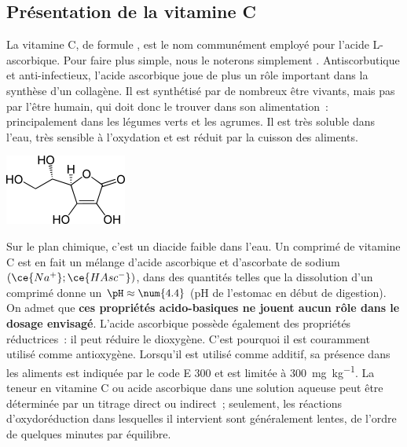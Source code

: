 \documentclass[../main/main.tex]{subfiles}
\begin{document}
{	\subsection{Présentation de la vitamine C}
	\noindent
	\begin{minipage}[t]{.70\linewidth}
		La vitamine C, de formule , est le nom communément employé pour
		l'acide L-ascorbique. Pour faire plus simple, nous le noterons simplement
		. Antiscorbutique et anti-infectieux, l'acide ascorbique joue de plus
		un rôle important dans la synthèse d'un collagène. Il est synthétisé par de
		nombreux être vivants, mais pas par l'être humain, qui doit donc le trouver dans
		son alimentation~: principalement dans les légumes verts et les agrumes. Il est
		très soluble dans l'eau, très sensible à l'oxydation et est réduit par la
		cuisson des aliments.
	\end{minipage}
	\hfill
	\begin{minipage}[t]{.30\linewidth}
		\vspace{0pt}
		\begin{center}
			\includegraphics[width=\linewidth]{h2asc.png}
		\end{center}
	\end{minipage}
	\bigbreak
	Sur le plan chimique, c'est un diacide faible dans l'eau. Un comprimé de
	vitamine C est en fait un mélange d'acide ascorbique  et d'ascorbate
	de sodium $(\ce{Na^+};\ce{HAsc^-})$, dans des quantités telles que la
	dissolution d'un comprimé donne un $\pH \approx \num{4.4}$ (pH de l'estomac en
	début de digestion). On admet que \textbf{ces propriétés acido-basiques ne
		jouent aucun rôle dans le dosage envisagé}.
	\bigbreak
	L'acide ascorbique possède également des propriétés réductrices~: il peut
	réduire le dioxygène. C'est pourquoi il est couramment utilisé comme
	antioxygène. Lorsqu'il est utilisé comme additif, sa présence dans les aliments
	est indiquée par le code E 300 et est limitée à \SI{300}{mg.kg^{-1}}. La teneur
	en vitamine C ou acide ascorbique dans une solution aqueuse peut être déterminée
	par un titrage direct ou indirect~; seulement, les réactions d'oxydoréduction
	dans lesquelles il intervient sont généralement lentes, de l'ordre de quelques
	minutes par équilibre.

}
\end{document}
